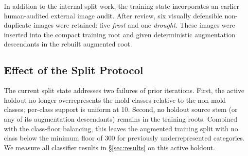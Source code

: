 In addition to the internal split work, the training state incorporates an
earlier human-audited external image audit. After review, six visually
defensible non-duplicate images were retained: five \emph{frost} and one
\emph{drought}. These images were inserted into the compact training root
and given deterministic augmentation descendants in the rebuilt augmented
root.

\subsection{Effect of the Split Protocol}

The current split state addresses two failures of prior iterations.
First, the active holdout no longer overrepresents the mold classes
relative to the non-mold classes; per-class support is uniform at 10.
Second, no holdout source stem (or any of its augmentation descendants)
remains in the training roots. Combined with the class-floor balancing,
this leaves the augmented training split with no class below the minimum
floor of 300 for previously underrepresented categories. We measure all
classifier results in \S\ref{sec:results} on this active holdout.
